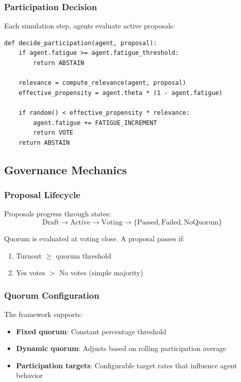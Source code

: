 \subsubsection{Participation Decision}

Each simulation step, agents evaluate active proposals:

\begin{lstlisting}[caption=Agent participation logic (pseudocode)]
def decide_participation(agent, proposal):
    if agent.fatigue >= agent.fatigue_threshold:
        return ABSTAIN

    relevance = compute_relevance(agent, proposal)
    effective_propensity = agent.theta * (1 - agent.fatigue)

    if random() < effective_propensity * relevance:
        agent.fatigue += FATIGUE_INCREMENT
        return VOTE
    return ABSTAIN
\end{lstlisting}

\subsection{Governance Mechanics}

\subsubsection{Proposal Lifecycle}

Proposals progress through states:
\begin{equation}
\text{Draft} \rightarrow \text{Active} \rightarrow \text{Voting} \rightarrow \{\text{Passed}, \text{Failed}, \text{NoQuorum}\}
\end{equation}

Quorum is evaluated at voting close. A proposal passes if:
\begin{enumerate}
    \item Turnout $\geq$ quorum threshold
    \item Yes votes $>$ No votes (simple majority)
\end{enumerate}

\subsubsection{Quorum Configuration}

The framework supports:
\begin{itemize}
    \item \textbf{Fixed quorum}: Constant percentage threshold
    \item \textbf{Dynamic quorum}: Adjusts based on rolling participation average
    \item \textbf{Participation targets}: Configurable target rates that influence agent behavior
\end{itemize}


